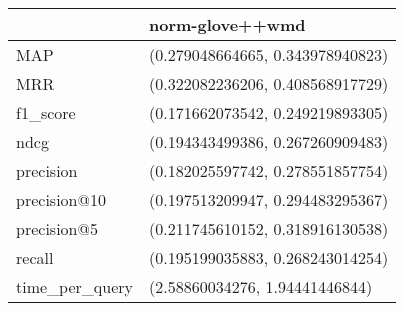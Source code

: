 \begin{tabular}{ll}
\toprule
{} &                   norm-glove++wmd \\
\midrule
MAP            &  (0.279048664665, 0.343978940823) \\
MRR            &  (0.322082236206, 0.408568917729) \\
f1\_score       &  (0.171662073542, 0.249219893305) \\
ndcg           &  (0.194343499386, 0.267260909483) \\
precision      &  (0.182025597742, 0.278551857754) \\
precision@10   &  (0.197513209947, 0.294483295367) \\
precision@5    &  (0.211745610152, 0.318916130538) \\
recall         &  (0.195199035883, 0.268243014254) \\
time\_per\_query &    (2.58860034276, 1.94441446844) \\
\bottomrule
\end{tabular}
